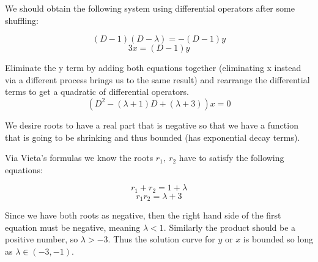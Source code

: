 \documentclass[11pt]{article}
\newcommand{\br}[1]{\left(#1\right)}
\begin{document}
We should obtain the following system using differential operators after some shuffling:

$$\br{D-1}\br{D-\lambda} = -\br{D-1}y$$
$$3x = \br{D-1}y$$

Eliminate the y term by adding both equations together (eliminating x instead via a different process brings us to the same result) and rearrange the differential terms to get a quadratic of differential operators.
$$\br{D^2-(\lambda + 1)D + (\lambda + 3)}x = 0$$

We desire roots to have a real part that is negative so that we have a function that is going to be shrinking and thus bounded (has exponential decay terms).

Via Vieta's formulas we know the roots $r_1,~ r_2$ have to satisfy the following equations:

$$r_1+r_2 = 1+\lambda$$
$$r_1r_2 = \lambda+3$$

Since we have both roots as negative, then the right hand side of the first equation must be negative, meaning $\lambda < 1$. Similarly the product should be a positive number, so $\lambda > -3$. Thus the solution curve for $y$ or $x$ is bounded so long as $\lambda \in \br{-3,-1}$.
\end{document}
